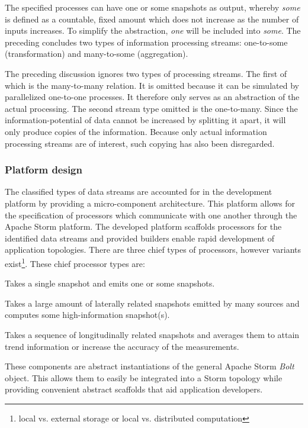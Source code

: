 The specified processes can have one or some snapshots as output, whereby \emph{some} is defined as a countable, fixed amount which does not increase as the number of inputs increases. To simplify the abstraction, \emph{one} will be included into \emph{some}. The preceding concludes two types of information processing streams: one-to-some (transformation) and many-to-some (aggregation).

The preceding discussion ignores two types of processing streams. The first of which is the many-to-many relation. It is omitted because it can be simulated by parallelized one-to-one processes. It therefore only serves as an abstraction of the actual processing. The second stream type omitted is the one-to-many. Since the information-potential of data cannot be increased by splitting it apart, it will only produce copies of the information. Because only actual information processing streams are of interest, such copying has also been disregarded.

\subsubsection{Platform design}
The classified types of data streams are accounted for in the development platform by providing a micro-component architecture. This platform allows for the specification of processors which communicate with one another through the Apache Storm platform. The developed platform scaffolds processors for the identified data streams and provided builders enable rapid development of application topologies. There are three chief types of processors, however variants exist\setcounter{footnote}{2}\footnote{local vs. external storage or local vs. distributed computation}. These chief processor types are:
\begin{description}[style=nextline]
\nospace
\item[SingleMessageProcessor]Takes a single snapshot and emits one or some snapshots.
\item[AccumulatorProcessor]Takes a large amount of laterally related snapshots emitted by many sources and computes some high-information snapshot(s).
\item[BufferedProcessor]Takes a sequence of longitudinally related snapshots and averages them to attain trend information or increase the accuracy of the measurements.
\end{description}
These components are abstract instantiations of the general Apache Storm \emph{Bolt} object. This allows them to easily be integrated into a Storm topology while providing convenient abstract scaffolds that aid application developers.

